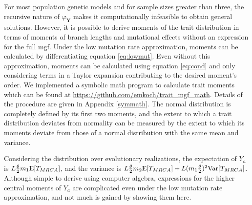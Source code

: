 \newcommand{\AAA}{\E[\mathbbm{T}_{4,4}] + \frac{1}{3}\E[\mathbbm{T}_{3,4}] + \frac{2}{9}\E[\mathbbm{T}_{2,4}]}
\newcommand{\BBB}{\frac{1}{9}\E[\mathbbm{T}_{2,4}] + \frac{1}{6}\E[\mathbbm{T}_{3,4}]}
\newcommand{\CCC}{\E[\mathbbm{T}_{4,4}] - \frac{1}{6}\E[\mathbbm{T}_{3,4}] - \frac{1}{9}\E[\mathbbm{T}_{2,4}]}

For most population genetic models and for sample sizes greater than three, the
recursive nature of $\varphi_{\mathbf{Y}}$ makes it computationally
infeasible to obtain general solutions. However, it is possible to derive
moments of the trait distribution in terms of moments of branch lengths and
mutational effects without an expression for the full mgf. Under the low
mutation rate approximation, moments can be calculated by differentiating
equation \eqref{eq:lowmut}. Even without this approximation, moments can be
calculated using equation \eqref{eq:cond} and only considering terms in a Taylor
expansion contributing to the desired moment's order. We implemented a symbolic
math program to calculate trait moments which can be found at
\url{https://github.com/emkoch/trait_mgf_math}. Details of the procedure are
given in Appendix \ref{symmath}. The normal distribution is completely defined
by its first two moments, and the extent to which a trait distribution deviates
from normality can be measured by the extent to which its moments deviate from
those of a normal distribution with the same mean and variance.

Considering the distribution over evolutionary realizations, the expectation of
$Y_a$ is $L \frac{\theta}{2} m_1 \mathrm{E}[T_{MRCA}]$, and the variance is $L \frac{\theta}{2} m_2 \mathrm{E}[T_{MRCA}] +
L(m_1\frac{\theta}{2})^2\mathrm{Var}[T_{MRCA}]$. Although simple to derive using computer algebra,
expressions for the higher central moments of $Y_a$ are complicated even under
the low mutation rate approximation, and not much is gained by showing them
here.

